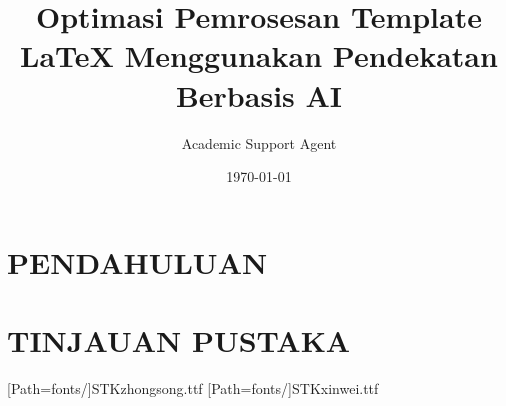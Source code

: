 \documentclass{ctexart}
\title{Optimasi Pemrosesan Template LaTeX Menggunakan Pendekatan Berbasis AI}
\author{Academic Support Agent}
\date{\today}
\begin{document}
\maketitle

\begin{abstract}

\end{abstract}

\chapter{PENDAHULUAN}


\chapter{TINJAUAN PUSTAKA}


\usepackage[normalem]{ulem}
\useunder{\uline}{\ul}{}
\usepackage{xeCJK}
\usepackage{amssymb}
\usepackage{amsmath}
\usepackage{listings} %
\usepackage{graphicx}
\usepackage{multicol} %
\usepackage{xcolor}
\usepackage{geometry} %
\usepackage{fontspec}
\usepackage{setspace}
\usepackage{times}
\usepackage{fancyhdr} %
\pagestyle{fancy}
\usepackage{float} %
\usepackage{titlesec} %
\usepackage{titletoc}
\usepackage{ctex}
\usepackage{gbt7714}    %
\usepackage{multirow}
\usepackage{booktabs}   %
\usepackage{setspace}   %
\usepackage{caption} %
\usepackage{subcaption} %
\usepackage{changepage} %


\graphicspath{ {include_picture/} }
\let\algorithm\relax
\let\endalgorithm\relax
\usepackage[ruled,vlined]{algorithm2e}%
\usepackage{algpseudocode}
\renewcommand{\algorithmicrequire}{\textbf{Input:}} 
\renewcommand{\algorithmicensure}{\textbf{Output:}}

\DeclareMathOperator*{\argmax}{arg\,max}
\DeclareMathOperator*{\argmin}{arg\,min}
\captionsetup[figure]{labelfont=bf, labelsep=mysep, textfont=bf}   %

\setmainfont[Path=fonts/, 
BoldFont = times-new-roman-bold.ttf,
ItalicFont = times-new-roman-italic.ttf,
BoldItalicFont = times-new-roman-bold-italic.ttf
]{times-new-roman.ttf}
\setmonofont[Path=fonts/]{Courier New.ttf}
[Path=fonts/]{STKzhongsong.ttf}%
\newcommand{\zhongsong}{\CJKfamily{hwzs}}
[Path=fonts/]{STKxinwei.ttf} %
\newcommand{\xinwei}{\CJKfamily{hwxw}}              %
\end{document}
